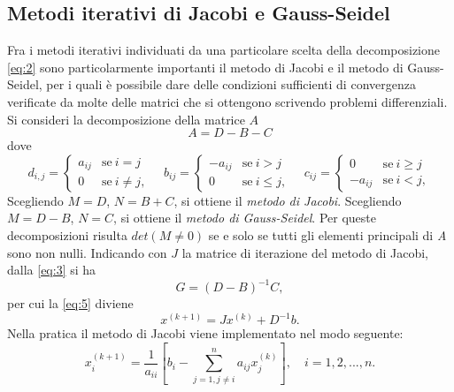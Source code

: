 \documentclass[12pt]{article}
\begin{document}
\subsection{Metodi iterativi di Jacobi e Gauss-Seidel}
Fra i metodi iterativi individuati da una particolare scelta della decomposizione \eqref{eq:2} sono particolarmente importanti il metodo di Jacobi e il metodo di Gauss-Seidel, per i quali è possibile dare delle condizioni sufficienti di convergenza verificate da molte delle matrici che si ottengono scrivendo problemi differenziali.\\
Si consideri la decomposizione della matrice \(A\)
\begin{equation*}
    A=D-B-C
\end{equation*}
dove
\begin{equation*}
    d_{i,j}=
    \begin{cases}
        a_{ij} &\text{se}\: i=j\\
        0 &\text{se} \: i \neq j,
    \end{cases}
    \quad
    b_{ij}=
    \begin{cases}
        -a_{ij} &\text{se}\: i>j\\
        0 &\text{se} \: i \leq j,
    \end{cases}
    \quad
    c_{ij}=
    \begin{cases}
        0 &\text{se}\: i \geq j\\
        -a_{ij} &\text{se} \: i<j,
    \end{cases}
\end{equation*}
Scegliendo \(M=D\), \quad \(N=B+C\), si ottiene il \textit{metodo di Jacobi}.
Scegliendo \(M=D-B\), \quad \(N=C\), si ottiene il \textit{metodo di Gauss-Seidel}.
Per queste decomposizioni risulta \(det(M \neq 0)\) se e solo se tutti gli elementi principali di \textit{A} sono non nulli.
Indicando con \(J\) la matrice di iterazione del metodo di Jacobi, dalla \eqref{eq:3} si ha
\begin{equation*}
    G=(D-B)^{-1}C,
\end{equation*}
per cui la \eqref{eq:5} diviene
\begin{equation*}
    x^{(k+1)}=Jx^{(k)}+D^{-1}b.
\end{equation*}
Nella pratica il metodo di Jacobi viene implementato nel modo seguente:
\begin{equation}
    \label{eq:8}
    x^{(k+1)}_i=\frac{1}{a_{ii}} \left[ b_i - \sum_{j=1,j \neq i}^n a_{ij}x_j^{(k)} \right], \quad i=1,2,...,n.
\end{equation}
\end{document}
